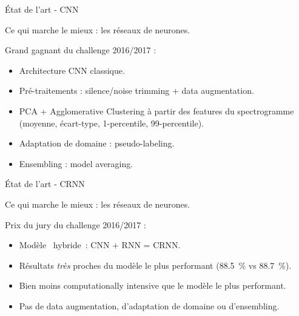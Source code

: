 \documentclass[compress,xcolor=table]{beamer}
\begin{document}
\begin{frame}{État de l'art - CNN}

    Ce qui marche le mieux : les réseaux de neurones.

    Grand gagnant du challenge 2016/2017 :

    \begin{exampleblock}{ \cite{grillTwoConvolutionalNeural2017}}

        \begin{itemize}
            \item Architecture CNN classique.
            \item Pré-traitements : silence/noise trimming + data augmentation.
            \item PCA + Agglomerative Clustering à partir des features du spectrogramme (moyenne, écart-type, 1-percentile, 99-percentile).
            \item Adaptation de domaine : pseudo-labeling.
            \item Ensembling : model averaging.
        \end{itemize}

    \end{exampleblock}

\end{frame}

\begin{frame}{État de l'art - CRNN}

    Ce qui marche le mieux : les réseaux de neurones.

    Prix du jury du challenge 2016/2017 :

    \begin{exampleblock}{ \cite{cakirConvolutionalRecurrentNeural2017a}}

        \begin{itemize}
            \item Modèle \og~hybride~\fg : CNN + RNN = CRNN.
            \item Résultats \textit{très} proches du modèle le plus performant (88.5~\% vs 88.7~\%).
            \item Bien moins computationally intensive que le modèle le plus performant.
            \item Pas de data augmentation, d'adaptation de domaine ou d'ensembling.
        \end{itemize}

    \end{exampleblock}

\end{frame}
\end{document}
